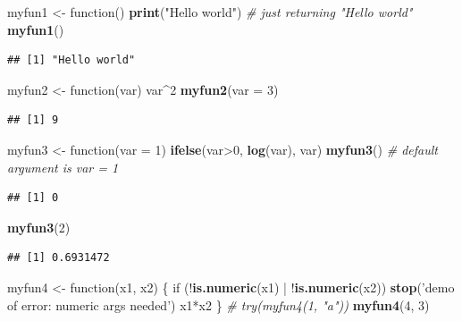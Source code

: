 \documentclass[]{book}
\newenvironment{Shaded}{\begin{snugshade}}{\end{snugshade}}
\newcommand{\KeywordTok}[1]{\textcolor[rgb]{0.13,0.29,0.53}{\textbf{{#1}}}}
\newcommand{\DataTypeTok}[1]{\textcolor[rgb]{0.13,0.29,0.53}{{#1}}}
\newcommand{\DecValTok}[1]{\textcolor[rgb]{0.00,0.00,0.81}{{#1}}}
\newcommand{\StringTok}[1]{\textcolor[rgb]{0.31,0.60,0.02}{{#1}}}
\newcommand{\CommentTok}[1]{\textcolor[rgb]{0.56,0.35,0.01}{\textit{{#1}}}}
\newcommand{\NormalTok}[1]{{#1}}
\theoremstyle{definition}
\theoremstyle{definition}
\theoremstyle{remark}
\begin{document}
\begin{Shaded}
\begin{Highlighting}[]
\NormalTok{myfun1 <-}\StringTok{ }\NormalTok{function() }\KeywordTok{print}\NormalTok{(}\StringTok{"Hello world"}\NormalTok{)  }\CommentTok{# just returning "Hello world"}
\KeywordTok{myfun1}\NormalTok{()  }
\end{Highlighting}
\end{Shaded}

\begin{verbatim}
## [1] "Hello world"
\end{verbatim}

\begin{Shaded}
\begin{Highlighting}[]
\NormalTok{myfun2 <-}\StringTok{ }\NormalTok{function(var) var^}\DecValTok{2} 
\KeywordTok{myfun2}\NormalTok{(}\DataTypeTok{var =} \DecValTok{3}\NormalTok{)}
\end{Highlighting}
\end{Shaded}

\begin{verbatim}
## [1] 9
\end{verbatim}

\begin{Shaded}
\begin{Highlighting}[]
\NormalTok{myfun3 <-}\StringTok{ }\NormalTok{function(}\DataTypeTok{var =} \DecValTok{1}\NormalTok{)  }\KeywordTok{ifelse}\NormalTok{(var>}\DecValTok{0}\NormalTok{, }\KeywordTok{log}\NormalTok{(var), var) }
\KeywordTok{myfun3}\NormalTok{()   }\CommentTok{# default argument is var = 1}
\end{Highlighting}
\end{Shaded}

\begin{verbatim}
## [1] 0
\end{verbatim}

\begin{Shaded}
\begin{Highlighting}[]
\KeywordTok{myfun3}\NormalTok{(}\DecValTok{2}\NormalTok{)}
\end{Highlighting}
\end{Shaded}

\begin{verbatim}
## [1] 0.6931472
\end{verbatim}

\begin{Shaded}
\begin{Highlighting}[]
\NormalTok{myfun4 <-}\StringTok{ }\NormalTok{function(x1, x2) \{}
            \NormalTok{if (!}\KeywordTok{is.numeric}\NormalTok{(x1) |}\StringTok{ }\NormalTok{!}\KeywordTok{is.numeric}\NormalTok{(x2)) }\KeywordTok{stop}\NormalTok{(}\StringTok{'demo of error: numeric args needed'}\NormalTok{)}
            \NormalTok{x1*x2}
          \NormalTok{\}}
\CommentTok{# try(myfun4(1, "a"))  }
\KeywordTok{myfun4}\NormalTok{(}\DecValTok{4}\NormalTok{, }\DecValTok{3}\NormalTok{)}
\end{Highlighting}
\end{Shaded}
\end{document}
